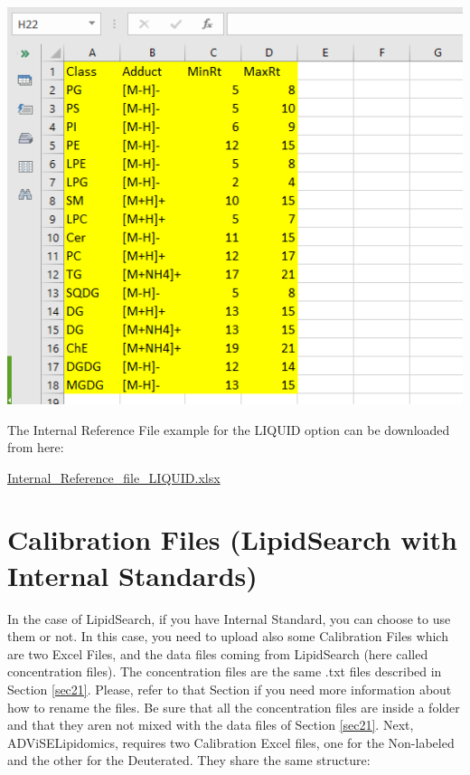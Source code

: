 \documentclass[
]{book}
\begin{document}
\includegraphics[width=1\linewidth]{images/int_reference_LIQUID}

The Internal Reference File example for the LIQUID option can be downloaded from here:

\href{https://github.com/ShinyFabio/ADViSELipidomics_book/raw/main/data_example/Internal_Reference_file_LIQUID.xlsx}{Internal\_Reference\_file\_LIQUID.xlsx}

\hypertarget{sec24}{%
\section{Calibration Files (LipidSearch with Internal Standards)}\label{sec24}}

In the case of LipidSearch, if you have Internal Standard, you can choose to use them or not. In this case, you need to upload also some Calibration Files which are two Excel Files, and the data files coming from LipidSearch (here called concentration files). The concentration files are the same .txt files described in Section \ref{sec21}. Please, refer to that Section if you need more information about how to rename the files. Be sure that all the concentration files are inside a folder and that they aren not mixed with the data files of Section \ref{sec21}.
Next, ADViSELipidomics, requires two Calibration Excel files, one for the Non-labeled and the other for the Deuterated. They share the same structure:
\end{document}
